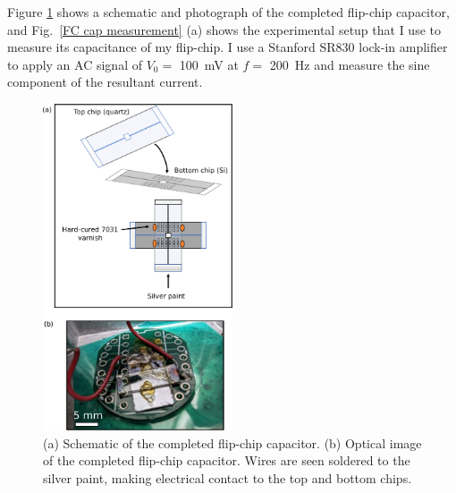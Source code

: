 \documentclass{beavtex_dub_edit}
\begin{document}
Figure \ref{flipping chips} shows a schematic and photograph of the completed flip-chip capacitor, and Fig.\ \ref{FC cap measurement} (a) shows the experimental setup that I use to measure its capacitance of my flip-chip. I use a Stanford SR830 lock-in amplifier to apply an AC signal of $V_0 = $ \SI{100}{\milli\volt} at $f = $ \SI{200}{\hertz} and measure the sine component of the resultant current. 

\begin{figure}
    \includegraphics[width=0.5\textwidth]{flipping chips.pdf}
    \caption{(a) Schematic of the completed flip-chip capacitor. (b) Optical image of the completed flip-chip capacitor. Wires are seen soldered to the silver paint, making electrical contact to the top and bottom chips.}
    \label{flipping chips}
\end{figure}
\end{document}
